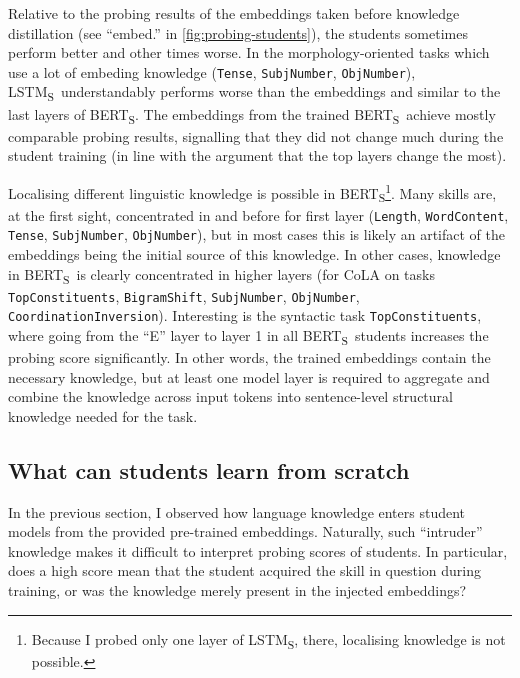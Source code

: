 \documentclass[bsc,frontabs,twoside,singlespacing,parskip,deptreport]{infthesis}
\def\BERTS{BERT\textsubscript{S}}
\def\LSTMS{LSTM\textsubscript{S}}
\begin{document}
{{{      %
      Relative to the probing results of the embeddings taken before knowledge distillation (see ``embed.'' in \autoref{fig:probing-students}), the students sometimes perform better and other times worse. In the morphology-oriented tasks which use a lot of embeding knowledge (\verb|Tense|, \verb|SubjNumber|, \verb|ObjNumber|), \LSTMS~understandably performs worse than the embeddings and similar to the last layers of \BERTS. The embeddings from the trained \BERTS~achieve mostly comparable probing results, signalling that they did not change much during the student training (in line with the argument that the top layers change the most).
      
      Localising different linguistic knowledge is possible in \BERTS\footnote{Because I probed only one layer of \LSTMS, there, localising knowledge is not possible.}. Many skills are, at the first sight, concentrated in and before for first layer (\verb|Length|, \verb|WordContent|, \verb|Tense|, \verb|SubjNumber|, \verb|ObjNumber|), but in most cases this is likely an artifact of the embeddings being the initial source of this knowledge. In other cases, knowledge in \BERTS~is clearly concentrated in higher layers (for CoLA on tasks \verb|TopConstituents|, \verb|BigramShift|, \verb|SubjNumber|, \verb|ObjNumber|, \verb|CoordinationInversion|). Interesting is the syntactic task \verb|TopConstituents|, where going from the ``E'' layer to layer 1 in all \BERTS~students increases the probing score significantly. In other words, the trained embeddings contain the necessary knowledge, but at least one model layer is required to aggregate and combine the knowledge across input tokens into sentence-level structural knowledge needed for the task.
    }

    \subsection{What can students learn from scratch}{
      In the previous section, I observed how language knowledge enters student models from the provided pre-trained embeddings. Naturally, such ``intruder'' knowledge makes it difficult to interpret probing scores of students. In particular, does a high score mean that the student acquired the skill in question during training, or was the knowledge merely present in the injected embeddings?

}}}
\end{document}
